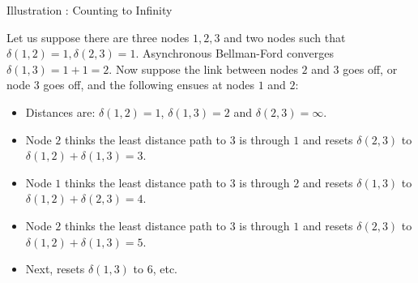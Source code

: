\begin{frame}{Illustration : Counting to Infinity}

Let us suppose there are three nodes $1, 2, 3$ and two nodes such that $\delta (1,2) = 1, \delta (2,3) = 1$. Asynchronous Bellman-Ford converges $\delta (1,3) = 1+1=2$.
Now suppose the link between nodes $2$ and $3$ goes off, or node $3$ goes off, and the following ensues at nodes $1$ and $2$:
\begin{itemize}
\item Distances are: $\delta (1,2) = 1$, $\delta (1,3)=2$ and $\delta (2,3)=\infty$.
\item Node $2$ thinks the least distance path to $3$ is through $1$ and resets $\delta (2,3)$ to $\delta (1,2) + \delta (1,3) = 3$.
\item Node $1$ thinks the least distance path to $3$ is through $2$ and resets $\delta (1,3)$ to $\delta (1,2) + \delta (2,3) = 4$.
\item Node $2$ thinks the least distance path to $3$ is through $1$ and resets $\delta (2,3)$ to $\delta (1,2) + \delta (1,3) = 5$.
\item Next, resets $\delta (1,3)$ to $6$, etc.
\end{itemize}

\end{frame}


